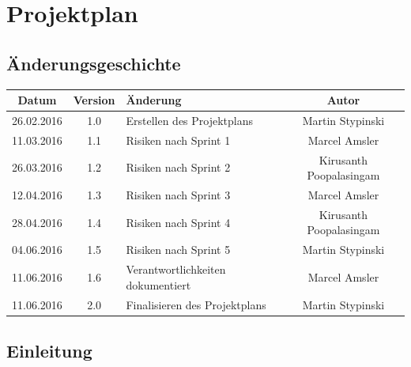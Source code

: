 
\newcommand{\greenbox}{
\begin{tikzpicture}
\draw[line width=0pt, fill=boxgreen]
(0, 0) rectangle (0.3, 0.3);
\end{tikzpicture}}

\newcommand{\orangebox}{
\begin{tikzpicture}
\draw[line width=0pt, fill=boxorange]
(0, 0) rectangle (0.3, 0.3);
\end{tikzpicture}}

\newcommand{\redbox}{
\begin{tikzpicture}
\draw[line width=0pt, fill=boxred]
(0, 0) rectangle (0.3, 0.3);
\end{tikzpicture}}

\chapter{Projektplan}
\section{Änderungsgeschichte}
\begin{tabularx}{\textwidth}{|c|c|X|c|}
  \hline
  \textbf{Datum} & \textbf{Version} & \textbf{Änderung} & \textbf{Autor} \\
  \hline \hline
  26.02.2016 & 1.0 & Erstellen des Projektplans & Martin Stypinski \\
  11.03.2016 & 1.1 & Risiken nach Sprint 1 & Marcel Amsler \\
  26.03.2016 & 1.2 & Risiken nach Sprint 2 & Kirusanth Poopalasingam \\
  12.04.2016 & 1.3 & Risiken nach Sprint 3 & Marcel Amsler \\
  28.04.2016 & 1.4 & Risiken nach Sprint 4 & Kirusanth Poopalasingam \\
  04.06.2016 & 1.5 & Risiken nach Sprint 5 & Martin Stypinski \\
  11.06.2016 & 1.6 & Verantwortlichkeiten dokumentiert & Marcel Amsler \\
  11.06.2016 & 2.0 & Finalisieren des Projektplans & Martin Stypinski \\
  \hline
\end{tabularx}

\section{Einleitung}
